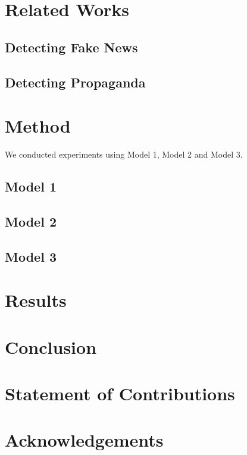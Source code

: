 \documentclass[11pt]{article}
\begin{document}
\section{Related Works}

\subsection{Detecting Fake News}



\subsection{Detecting Propaganda}




\section{Method}
We conducted experiments using Model 1, Model 2 and Model 3.

\subsection{Model 1}
\subsection{Model 2}
\subsection{Model 3}



\section{Results}



\section{Conclusion}



\section*{Statement of Contributions}

\section* {Acknowledgements}


%
%



\end{document}
